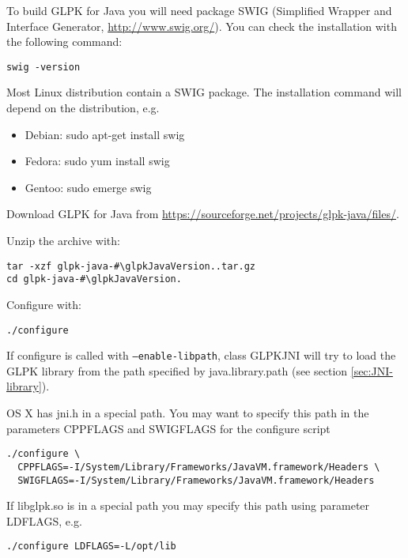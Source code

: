 \documentclass[a4paper,11pt]{report}
\newcommand{\glpkJavaVersion}{1.4.0}
\newcommand{\code}{\texttt}
\begin{document}
To build GLPK for Java you will need package SWIG (Simplified Wrapper and
Interface Generator, \href{http://www.swig.org/}{http://www.swig.org/}). You
can check the installation with the following command:

\begin{lstlisting}
swig -version
\end{lstlisting}

Most Linux distribution contain a SWIG package. The installation command will
depend on the distribution, e.g.

\begin{itemize}
\item Debian: sudo apt-get install swig
\item Fedora: sudo yum install swig
\item Gentoo: sudo emerge swig
\end{itemize}

Download GLPK for Java from \href{https://sourceforge.net/projects/glpk-java/files/}{https://sourceforge.net/projects/glpk-java/files/}.

Unzip the archive with:

\begin{lstlisting}
tar -xzf glpk-java-#\glpkJavaVersion..tar.gz
cd glpk-java-#\glpkJavaVersion.
\end{lstlisting}

Configure with:
\begin{lstlisting}
./configure
\end{lstlisting}

If configure is called with \code{--enable-libpath},
class GLPKJNI will try to load the GLPK library from the path specified by
java.library.path (see section \ref{sec:JNI-library}).

OS X has jni.h in a special path. You may want to specify this path in the
parameters CPPFLAGS and SWIGFLAGS for the configure script

\begin{lstlisting}
./configure \
  CPPFLAGS=-I/System/Library/Frameworks/JavaVM.framework/Headers \
  SWIGFLAGS=-I/System/Library/Frameworks/JavaVM.framework/Headers
\end{lstlisting}

If libglpk.so is in a special path you may specify this path using parameter
LDFLAGS, e.g.

\begin{lstlisting}
./configure LDFLAGS=-L/opt/lib
\end{lstlisting}
\end{document}
